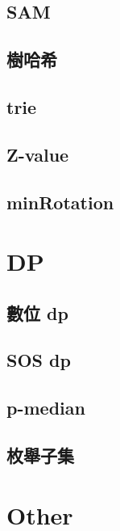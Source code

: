 \documentclass[a4paper,10pt,twocolumn,oneside]{article}
\begin{document}
\subsection{SAM}

\subsection{樹哈希}

\subsection{trie}

\subsection{Z-value}

\subsection{minRotation}

\section{DP}
\subsection{數位 dp}

\subsection{SOS dp}

\subsection{p-median}

\subsection{枚舉子集}


\section{Other}
\end{document}
